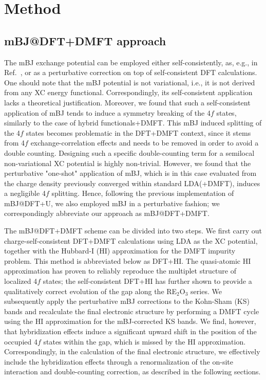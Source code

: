 \documentclass[aps,prb,twocolumn,amsmath,amssymb]{revtex4}
\begin{document}
\section{Method}

\subsection{mBJ@DFT+DMFT approach}


The mBJ exchange potential can be employed either self-consistently, as, e.g., in Ref.~, or as a perturbative correction on top of self-consistent DFT calculations\cite{Jiang2013}. One should note that  the mBJ potential is not variational, i.e., it is not derived from any XC energy functional. Correspondingly, its self-consistent application lacks a theoretical justification. Moreover, we found that such a self-consistent application of mBJ tends to  induce a symmetry breaking of the 4$f$ states, similarly to the case of hybrid functionals+DMFT\cite{Jacob2008}. This mBJ induced splitting of the 4$f$ states becomes problematic in the DFT+DMFT context, since it stems from 4$f$ exchange-correlation effects and needs to be removed  in order to avoid a double counting.  Designing such a specific double-counting term for a semilocal non-variational XC potential is highly non-trivial. However,  we found that the perturbative "one-shot" application of mBJ, which is in this case evaluated from the charge density previously converged within standard  LDA(+DMFT), induces a negligible 4$f$ splitting. Hence, following the previous implementation of mBJ@DFT+U\cite{Jiang2013}, we also employed mBJ in a perturbative fashion; we correspondingly abbreviate our approach as mBJ@DFT+DMFT.  

The  mBJ@DFT+DMFT scheme can be divided into two steps. We first carry out charge-self-consistent DFT+DMFT calculations using LDA as the XC potential, together with the Hubbard-I (HI) approximation\cite{Hubbard1963} for the DMFT impurity problem. This method is abbreviated below as DFT+HI. The quasi-atomic HI approximation has proven to reliably reproduce the  multiplet structure of localized 4$f$ states\cite{Pourovskii2009,Locht2016}; the self-consistent DFT+HI\cite{Pourovskii2007} has further shown to provide a qualitatively correct evolution of the gap along the RE$_2$O$_3$ series\cite{Tomczak2007}. We subsequently apply the perturbative mBJ corrections to the Kohn-Sham (KS) bands and recalculate the final electronic structure by performing a DMFT cycle using the HI approximation for the mBJ-corrected KS bands.   We find, however, that hybridization effects induce a significant upward shift in the position of the occupied 4$f$ states within the gap, which is missed by the HI approximation. Correspondingly, in the calculation of the final electronic structure, we effectively include the hybridization effects  through a renormalization of the on-site interaction and double-counting correction, as described in the following sections.  
\end{document}
